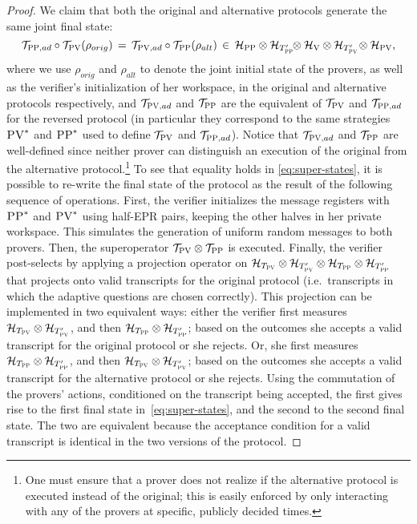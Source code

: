 \documentclass[11pt]{article}
\newcommand{\mH}{\mathcal{H}}
\newcommand{\mT}{\mathcal{T}}
\newcommand{\ver}{\textsc{V}}
\newcommand{\pv}{\textsc{PV}}
\newcommand{\pp}{\textsc{PP}}
\begin{document}
\begin{proof}
We claim that both the original and alternative protocols generate the same joint final state:
\begin{equation}\label{eq:super-states}
\mT_{\pp,ad}\circ\mT_\pv(\rho_{orig}) \,=\, \mT_{\pv,ad}\circ \mT_\pp(\rho_{alt}) \,\in\,  \mH_{\pp}\otimes \mH_{T'_{\pp}}\!\! \otimes \mH_\ver \otimes \mH_{T'_\pv}\! \otimes \mH_\pv,
\end{equation}
where we use $\rho_{orig}$ and $\rho_{alt}$ to denote the joint initial state
  of the provers, as well as the verifier's initialization of her workspace, in
  the original and alternative protocols respectively, and $\mT_{\pv,ad}$ and $\mT_\pp$ are the equivalent of $\mT_\pv$ and $\mT_{\pp,ad}$ for the reversed protocol (in particular they correspond to the same strategies $\pv^*$ and $\pp^*$ used to define $\mT_\pv$ and  $\mT_{\pp,ad}$). Notice that $\mT_{\pv,ad}$ and $\mT_\pp$ are well-defined since neither prover can distinguish %
an execution of the original 
from 
the alternative protocol.\footnote{One must ensure that a prover does not realize if the  alternative protocol is executed instead of the original; this is easily enforced by only interacting with any of the provers at specific, publicly decided times.}
To see that 
equality holds in \eqref{eq:super-states},
it is possible to re-write the final state of the protocol as the
  result of the following sequence of operations. First, the verifier
  initializes the message registers with $\pp^*$ and $\pv^*$ using half-EPR
  pairs, keeping the other halves in her private workspace. This simulates the
  generation of 
uniform
random messages to both provers. Then, the
  superoperator $\mT_\pv \otimes \mT_\pp$ is executed. Finally, the verifier
  post-selects by applying a projection operator on $\mH_{T_\pv} \otimes \mH_{T'_\pv} \otimes \mH_{T_\pp} \otimes \mH_{T'_\pp}$ 
that 
projects onto valid transcripts for the
  original protocol (i.e.\ transcripts in which the adaptive questions are chosen
  correctly). This projection can be implemented in two equivalent ways: either
  the verifier first measures $ \mH_{T_\pv} \otimes \mH_{T'_\pv}$, and then
  $\mH_{T_\pp} \otimes \mH_{T'_\pp}$; based on the outcomes she accepts a valid transcript for the
  original protocol or she rejects. Or, she first measures $ \mH_{T_\pp} \otimes \mH_{T'_\pp}$, and then
  $\mH_{T_\pv} \otimes \mH_{T'_\pv}$; based on the outcomes she accepts a
  valid transcript for the alternative protocol or she rejects. Using the
  commutation of the provers' actions, conditioned on the transcript being
  accepted, the first gives rise to the first final state
  in~\eqref{eq:super-states}, and the second to the second final state. The two are equivalent because the acceptance condition for a valid transcript is identical in the two versions of the protocol.



\end{proof}
\end{document}
